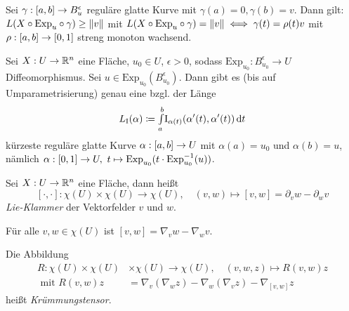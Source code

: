 \documentclass{cheat-sheet}
\newcommand{\FFI}{\mathrm{I}} %
\newcommand{\Exp}{\mathrm{Exp}} %
\begin{document}

\begin{satz}
  Sei $\gamma : \left[ a, b \right] \to B_u^\epsilon$ reguläre glatte Kurve mit $\gamma(a) = 0, \gamma(b) = v$. Dann gilt: $L(X \circ \Exp_u \circ \gamma) \geq \norm{v}$ mit $L(X \circ \Exp_u \circ \gamma) = \norm{v} \iff \gamma(t) = \rho(t)v$ mit $\rho : \left[ a, b \right] \to \left[ 0, 1 \right]$ streng monoton wachsend.
\end{satz}

\begin{satz}
  Sei $X : U \to \mathbb{R}^n$ eine Fläche, $u_0 \in U$, $\epsilon > 0$, sodass $\Exp_{u_0} : B_{u_0}^{\epsilon} \to U$ Diffeomorphismus. Sei $u \in \Exp_{u_0}(B_{u_0}^{\epsilon})$. Dann gibt es (bis auf Umparametrisierung) genau eine bzgl. der Länge
  \[ L_\FFI(\alpha) \coloneqq \Int{a}{b}{\FFI_{\alpha(t)}(\alpha'(t), \alpha'(t))}{t} \]
  kürzeste reguläre glatte Kurve $\alpha : \left[ a, b \right] \to U$ mit $\alpha(a) = u_0$ und $\alpha(b) = u$, nämlich $\alpha : \cinterval{0}{1} \to U, \  t \mapsto \Exp_{u_0}(t \cdot \Exp_{u_0}^{-1}(u))$.
\end{satz}



\begin{defn}
  Sei $X : U \to \mathbb{R}^n$ eine Fläche, dann heißt
  \[
    [\cdot,\cdot] : \chi(U) \times \chi(U) \to \chi(U), \quad
    (v, w) \mapsto [v, w] = \partial_v w - \partial_w v
  \]
  \emph{Lie-Klammer} der Vektorfelder $v$ und $w$.
\end{defn}

\begin{satz}
  Für alle $v, w \in \chi(U)$ ist $[v, w] = \nabla_v w - \nabla_w v$.
\end{satz}


\begin{defn}
  Die Abbildung
  \begin{align*}
    R : \chi(U) \times \chi(U) &\times \chi(U) \to \chi(U), \quad (v, w, z) \mapsto R(v, w) z \\
    \text{ mit } R(v, w) z &= \nabla_v (\nabla_w z) - \nabla_w (\nabla_v z) - \nabla_{[v, w]} z
  \end{align*}
  heißt \emph{Krümmungstensor}.
\end{defn}
\end{document}
